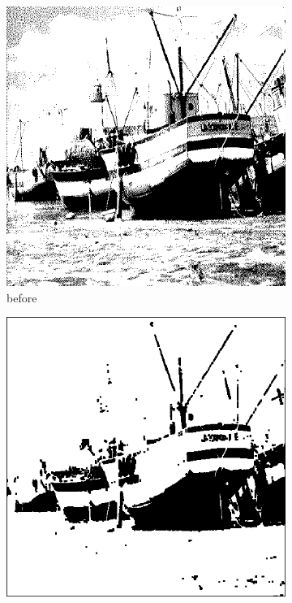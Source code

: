\documentclass[12pt]{article}
\renewcommand{\subfiguresize}{.25\textwidth}
\begin{document}
\begin{figure}[H]\centering
    \begin{subfigure}[t]{\subfiguresize}\centering
        \includegraphics[width=\textwidth]{img/magda/boatbw.png}
        \caption{before}
    \end{subfigure}
    \hspace{2em}
    \begin{subfigure}[t]{\subfiguresize}\centering
         \includegraphics[width=\textwidth]{img/magda/output6.png}

\end{subfigure}
\end{figure}
\end{document}
